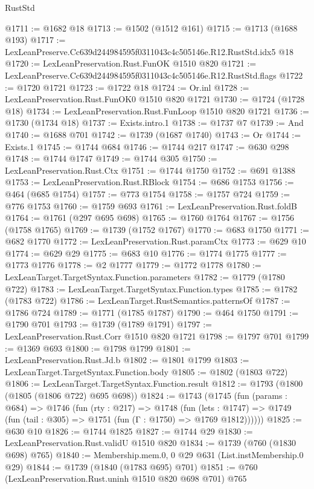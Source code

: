 \begin{lexlean}{RustStd}
\begin{coremodule}
@1711 := @1682 @18
@1713 := @1502 (@1512 @161)
@1715 := @1713 (@1688 @193)
@1717 := LexLeanPreserve.Cc639d244984595f0311043c4c505146e.R12.RustStd.idx5 @18
@1720 := LexLeanPreservation.Rust.FunOK @1510 @820
@1721 := LexLeanPreserve.Cc639d244984595f0311043c4c505146e.R12.RustStd.flags
@1722 := @1720 @1721
@1723 := @1722 @18
@1724 := Or.inl
@1728 := LexLeanPreservation.Rust.FunOK0 @1510 @820 @1721
@1730 := @1724 (@1728 @18)
@1734 := LexLeanPreservation.Rust.FunLoop @1510 @820 @1721
@1736 := @1730 (@1734 @18)
@1737 := Exists.intro.{1}
@1738 := @1737 @7
@1739 := And
@1740 := @1688 @701
@1742 := @1739 (@1687 @1740)
@1743 := Or
@1744 := Exists.{1}
@1745 := @1744 @684
@1746 := @1744 @217
@1747 := @630 @298
@1748 := @1744 @1747
@1749 := @1744 @305
@1750 := LexLeanPreservation.Rust.Ctx
@1751 := @1744 @1750
@1752 := @691 @1388
@1753 := LexLeanPreservation.Rust.RBlock
@1754 := @686 @1753
@1756 := @464 (@685 @1754)
@1757 := @773 @1754
@1758 := @1757 @724
@1759 := @776 @1753
@1760 := @1759 @693
@1761 := LexLeanPreservation.Rust.foldB
@1764 := @1761 (@297 @695 @698)
@1765 := @1760 @1764
@1767 := @1756 (@1758 @1765)
@1769 := @1739 (@1752 @1767)
@1770 := @683 @1750
@1771 := @682 @1770
@1772 := LexLeanPreservation.Rust.paramCtx
@1773 := @629 @10
@1774 := @629 @29
@1775 := @683 @10
@1776 := @1774 @1775
@1777 := @1773 @1776
@1778 := @2 @1777
@1779 := @1772 @1778
@1780 := LexLeanTarget.TargetSyntax.Function.parameters
@1782 := @1779 (@1780 @722)
@1783 := LexLeanTarget.TargetSyntax.Function.types
@1785 := @1782 (@1783 @722)
@1786 := LexLeanTarget.RustSemantics.patternsOf
@1787 := @1786 @724
@1789 := @1771 (@1785 @1787)
@1790 := @464 @1750
@1791 := @1790 @701
@1793 := @1739 (@1789 @1791)
@1797 := LexLeanPreservation.Rust.Corr @1510 @820 @1721
@1798 := @1797 @701
@1799 := @1369 @693
@1800 := @1798 @1799
@1801 := LexLeanPreservation.Rust.Jd.b
@1802 := @1801 @1799
@1803 := LexLeanTarget.TargetSyntax.Function.body
@1805 := @1802 (@1803 @722)
@1806 := LexLeanTarget.TargetSyntax.Function.result
@1812 := @1793 (@1800 (@1805 (@1806 @722) @695 @698))
@1824 := @1743
    (@1745
      (fun (params : @684) =>
      @1746
        (fun (rty : @217) =>
        @1748
          (fun (lets : @1747) =>
          @1749 (fun (tail : @305) => @1751 (fun (Γ : @1750) => @1769 @1812))))))
@1825 := @630 @10
@1826 := @1744 @1825
@1827 := @1744 @29
@1830 := LexLeanPreservation.Rust.validU @1510 @820
@1834 := @1739 (@760 (@1830 @698) @765)
@1840 := Membership.mem.{0, 0} @29 @631 (List.instMembership.{0} @29)
@1844 := @1739 (@1840 (@1783 @695) @701)
@1851 := @760 (LexLeanPreservation.Rust.uninh @1510 @820 @698 @701) @765

\end{coremodule}
\end{lexlean}
